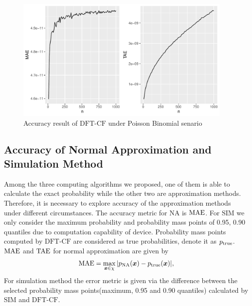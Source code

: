 \documentclass[12pt]{article}
\newcommand{\TAE}{{\rm TAE}}
\newcommand{\MAE}{{\rm MAE}}
\newcommand{\xvec}{\boldsymbol{x}}
\newcommand{\SIM}{{\textrm{SIM}}}
\newcommand{\NA}{{\textrm{NA}}}
\newcommand{\dft}{{\textrm{DFT-CF}}}
\begin{document}
\begin{figure}%
	\centering
	\includegraphics[width=0.95\textwidth]{figures/poib.pdf}
	\caption{Accuracy result of $\dft$ under Poisson Binomial senario}
	\label{fig: dft accuracy}
\end{figure}







\subsection{Accuracy of Normal Approximation and Simulation Method}
Among the three computing algorithms we proposed, one of them is able to calculate the exact probability while the other two are approximation methods. Therefore, it is necessary to explore accuracy of the approximation methods under different circumstances. The accuracy metric for $\NA$ is $\MAE$. For $\SIM$ we only consider the maximum probability and probability mass points of 0.95, 0.90 quantiles due to computation capability of device. Probability mass points computed by $\dft$ are considered as true probabilities, denote it as $p_{\rm true}$.
$\MAE$ and $\TAE$ for normal approximation are given by
\begin{equation*}
    \MAE = \max_{\xvec \in \chi}|p_{\NA}(\xvec)-p_{\rm true}(\xvec)|,
\end{equation*}
For simulation method the error metric is given via the difference between the selected probability mass points(maximum, 0.95 and 0.90 quantiles) calculated by $\SIM$ and $\dft$.
\end{document}
